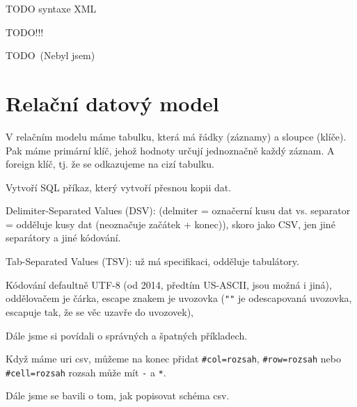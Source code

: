\documentclass[12pt]{article}					%
\begin{document}
TODO syntaxe XML


TODO!!!


TODO (Nebyl jsem)


\section{Relační datový model}
\begin{definice}
	V relačním modelu máme tabulku, která má řádky (záznamy) a sloupce (klíče). Pak máme primární klíč, jehož hodnoty určují jednoznačně každý záznam. A foreign klíč, tj. že se odkazujeme na cizí tabulku.
\end{definice}

\begin{definice}
	Vytvoří SQL příkaz, který vytvoří přesnou kopii dat.
\end{definice}

\begin{poznamka}
	Delimiter-Separated Values (DSV): (delmiter = označerní kusu dat vs. separator = odděluje kusy dat (neoznačuje začátek + konec)), skoro jako CSV, jen jiné separátory a jiné kódování.

	Tab-Separated Values (TSV): už má specifikaci, odděluje tabulátory.
\end{poznamka}

\begin{definice}
	Kódování defaultně UTF-8 (od 2014, předtím US-ASCII, jsou možná i jiná), oddělovačem je čárka, escape znakem je uvozovka (\verb|""| je odescapovaná uvozovka, escapuje tak, že se věc uzavře do uvozovek), 
\end{definice}

\begin{poznamka}
	Dále jsme si povídali o správných a špatných příkladech.
\end{poznamka}

\begin{definice}
	Když máme uri csv, můžeme na konec přidat \verb|#col=rozsah|, \verb|#row=rozsah| nebo \verb|#cell=rozsah| rozsah může mít \verb|-| a \verb|*|.
\end{definice}

\begin{poznamka}
	Dále jsme se bavili o tom, jak popisovat schéma csv.
\end{poznamka}
\end{document}
